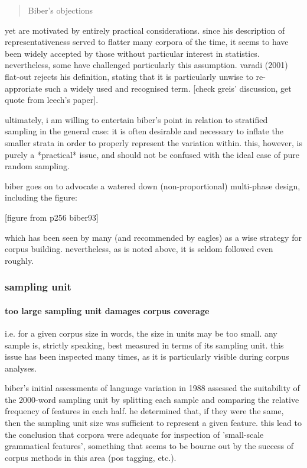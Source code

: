 \begin{quotation}
Biber's objections
\end{quotation}

yet are motivated by entirely practical considerations.  since his description of representativeness served to flatter many corpora of the time, it seems to have been widely accepted by those without particular interest in statistics.  nevertheless, some have challenged particularly this assumption.  varadi (2001) flat-out rejects his definition, stating that it is particularly unwise to re-approriate such a widely used and recognised term.  [check greis' discussion, get quote from leech's paper].

ultimately, i am willing to entertain biber's point in relation to stratified sampling in the general case: it is often desirable and necessary to inflate the smaller strata in order to properly represent the variation within.  this, however, is purely a *practical* issue, and should not be confused with the ideal case of pure random sampling.

biber goes on to advocate a watered down (non-proportional) multi-phase design, including the figure:

[figure from p256 biber93]

which has been seen by many (and recommended by eagles) as a wise strategy for corpus building.  nevertheless, as is noted above, it is seldom followed even roughly.


\subsubsection{sampling unit}

\paragraph{ too large sampling unit damages corpus coverage}
i.e. for a given corpus size in words, the size in units may be too small.
any sample is, strictly speaking, best measured in terms of its sampling unit.  this issue has been inspected many times, as it is particularly visible during corpus analyses.

biber's initial assessments of language variation in 1988 assessed the suitability of the 2000-word sampling unit by splitting each sample and comparing the relative frequency of features in each half.  he determined that, if they were the same, then the sampling unit size was sufficient to represent a given feature.  this lead to the conclusion that corpora were adequate for inspection of 'small-scale grammatical features', something that seems to be bourne out by the success of corpus methods in this area (pos tagging, etc.).


